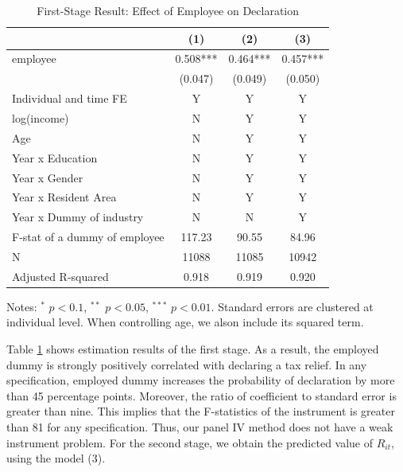 \documentclass[
  11pt,
  a4paper,
]{article}
\begin{document}
\begin{table}

\caption{\label{tab:stage1Report}First-Stage Result: Effect of Employee on Declaration}
\centering
\fontsize{9}{11}\selectfont
\begin{threeparttable}
\begin{tabular}[t]{lccc}
\toprule
 & (1) & (2) & (3)\\
\midrule
employee & 0.508*** & 0.464*** & 0.457***\\
 & (0.047) & (0.049) & (0.050)\\
Individual and time FE & Y & Y & Y\\
log(income) & N & Y & Y\\
Age & N & Y & Y\\
Year x Education & N & Y & Y\\
Year x Gender & N & Y & Y\\
Year x Resident Area & N & Y & Y\\
Year x Dummy of industry & N & N & Y\\
F-stat of a dummy of employee & 117.23 & 90.55 & 84.96\\
N & 11088 & 11085 & 10942\\
Adjusted R-squared & 0.918 & 0.919 & 0.920\\
\bottomrule
\end{tabular}
\begin{tablenotes}
\item Notes: $^{*}$ $p < 0.1$, $^{**}$ $p < 0.05$, $^{***}$ $p < 0.01$. Standard errors are clustered at individual level. When controlling age, we alson include its squared term.
\end{tablenotes}
\end{threeparttable}
\end{table}

Table \ref{tab:stage1Report} shows estimation results of the first stage.
As a result, the employed dummy is strongly positively correlated with declaring a tax relief.
In any specification, employed dummy increases the probability of declaration by more than 45 percentage points.
Moreover, the ratio of coefficient to standard error is greater than nine.
This implies that the F-statistics of the instrument is greater than 81 for any specification.
Thus, our panel IV method does not have a weak instrument problem.
For the second stage, we obtain the predicted value of \(R_{it}\), using the model (3).
\end{document}

